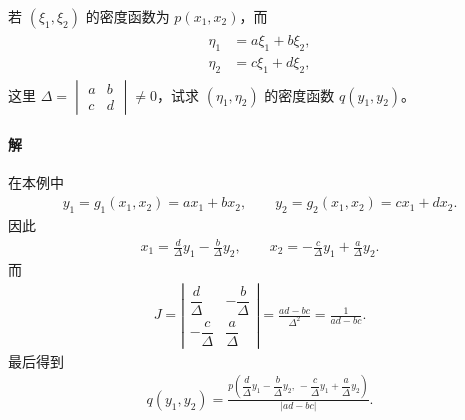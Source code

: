 \documentclass[../../main.tex]{subfiles}
\begin{document}
\begin{example}[线性变换]\label{example:ch03-二维线性变换}
若 $(\xi_1,\xi_2)$ 的密度函数为 $p(x_1,x_2)$，而
\begin{align}
\begin{aligned}
\eta_1&=a\xi_1+b\xi_2,\\
\eta_2&=c\xi_1+d\xi_2,
\end{aligned}\label{align:ch03-二维线性变换}
\end{align}
这里 $\Delta=\begin{vmatrix}a&b\\ c&d\end{vmatrix}\neq 0$，试求 $(\eta_1,\eta_2)$ 的密度函数 $q(y_1,y_2)$。

\paragraph*{解}在本例中
\begin{align*}y_1=g_1(x_1,x_2)=ax_1+bx_2,\qquad y_2=g_2(x_1,x_2)=cx_1+dx_2.\end{align*}
因此
\begin{align*}x_1=\frac{d}{\Delta}y_1-\frac{b}{\Delta}y_2,\qquad x_2=-\frac{c}{\Delta}y_1+\frac{a}{\Delta}y_2.\end{align*}
而
\begin{align*}J=\left|\begin{array}{rr}
\dfrac{d}{\Delta} & -\dfrac{b}{\Delta}\\[4pt]
-\dfrac{c}{\Delta} & \dfrac{a}{\Delta}
\end{array}\right|=\frac{ad-bc}{\Delta^{2}}=\frac{1}{ad-bc}.\end{align*}
最后得到
\begin{align}
q(y_1,y_2)=\frac{p\!\left(\dfrac{d}{\Delta}y_1-\dfrac{b}{\Delta}y_2,\,-\dfrac{c}{\Delta}y_1+\dfrac{a}{\Delta}y_2\right)}{|ad-bc|}.\label{align:ch03-二维线性变换密度}
\end{align}
\end{example}
\end{document}
